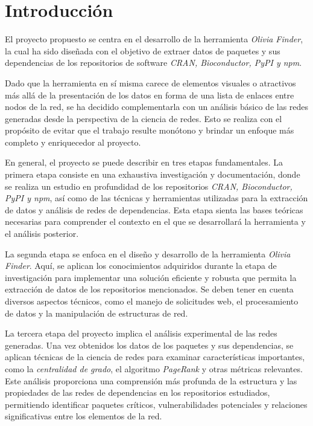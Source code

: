 
\section{Introducción}

El proyecto propuesto se centra en el desarrollo de la herramienta \textit{Olivia Finder}, 
la cual ha sido diseñada con el objetivo de extraer datos de paquetes y sus dependencias de 
los repositorios de software \textit{CRAN, Bioconductor, PyPI y npm}. 

Dado que la herramienta en sí misma carece de elementos visuales o atractivos más allá 
de la presentación de los datos en forma de una lista de enlaces entre nodos de la red, 
se ha decidido complementarla con un análisis básico de las redes generadas desde la perspectiva 
de la ciencia de redes. Esto se realiza con el propósito de evitar que el trabajo resulte monótono 
y brindar un enfoque más completo y enriquecedor al proyecto.

En general, el proyecto se puede describir en tres etapas fundamentales. 
La primera etapa consiste en una exhaustiva investigación y documentación, donde se realiza un estudio 
en profundidad de los repositorios \textit{CRAN, Bioconductor, PyPI y npm}, así como de las técnicas y herramientas 
utilizadas para la extracción de datos y análisis de redes de dependencias. Esta etapa sienta las bases teóricas 
necesarias para comprender el contexto en el que se desarrollará la herramienta y el análisis posterior.

La segunda etapa se enfoca en el diseño y desarrollo de la herramienta \textit{Olivia Finder}. 
Aquí, se aplican los conocimientos adquiridos durante la etapa de investigación para implementar una solución 
eficiente y robusta que permita la extracción de datos de los repositorios mencionados. 
Se deben tener en cuenta diversos aspectos técnicos, como el manejo de solicitudes web, el procesamiento de datos 
y la manipulación de estructuras de red.

La tercera etapa del proyecto implica el análisis experimental de las redes generadas. 
Una vez obtenidos los datos de los paquetes y sus dependencias, se aplican técnicas de la ciencia de redes 
para examinar características importantes, como la \textit{centralidad de grado}, el algoritmo \textit{PageRank} y 
otras métricas relevantes. Este análisis proporciona una comprensión más profunda de la estructura 
y las propiedades de las redes de dependencias en los repositorios estudiados, permitiendo identificar 
paquetes críticos, vulnerabilidades potenciales y relaciones significativas entre los elementos de la red.

